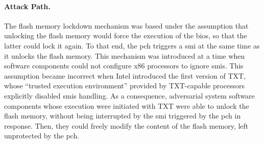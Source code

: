 \paragraph{Attack Path.}
%
The flash memory lockdown mechanism was based under the assumption that
unlocking the flash memory would force the execution of the \ac{bios}, so that
the latter could lock it again.
%
To that end, the \ac{pch} triggers a \ac{smi} at the same time as it unlocks the
flash memory.
%
This mechanism was introduced at a time when software components could not
configure x86 processors to ignore \acp{smi}.
%
This assumption became incorrect when Intel introduced the first version of TXT,
whose ``trusted execution environment'' provided by TXT-capable processors
explicitly disabled \acp{smi} handling.
%
As a consequence, adversarial system software components whose execution were
initiated with TXT were able to unlock the flash memory, without being
interrupted by the \ac{smi} triggered by the \ac{pch} in response.
%
Then, they could freely modify the content of the flash memory, left unprotected
by the \ac{pch}.

